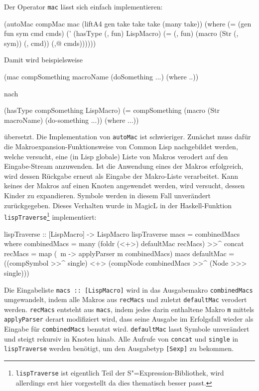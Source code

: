 \documentclass[12pt, a4paper, bibgerm]{scrbook}
\newenvironment{DIFnomarkup}{}{}
\newcommand\icode[1]{\lstinline?#1?}
\newcommand{\sexp}{S"=Expression}
\begin{document}
Der Operator \icode{mac} lässt sich einfach implementieren:
\begin{DIFnomarkup}\begin{code}
(autoMac compMac mac
  (liftA4 gen take take take (many take))
  (where (= (gen fun sym cmd cmds)
            (' (hasType (, fun) LispMacro)
               (= (, fun) (macro (Str (, sym)) (, cmd)) (,@ cmds))))))  
\end{code}\end{DIFnomarkup}
Damit wird beispielsweise 
\begin{DIFnomarkup}\begin{code}
(mac compSomething macroName 
    (doSomething ...) 
  (where ..))
\end{code}\end{DIFnomarkup}
nach
\begin{DIFnomarkup}\begin{code}
(hasType compSomething LispMacro)
(= compSomething (macro (Str macroName)
                   (do-something ...))
  (where ...))
\end{code}\end{DIFnomarkup}
übersetzt. Die Implementation von \icode{autoMac} ist
schwieriger. Zunächst muss dafür die Makroexpansion-Funktionsweise von
Common Lisp nachgebildet werden, welche versucht, eine (in Lisp globale)
Liste von Makros verodert auf den Eingabe-Stream anzuwenden. Ist die
Anwendung eines der Makros erfolgreich, wird dessen Rückgabe erneut als
Eingabe der Makro-Liste verarbeitet. Kann keines der Makros auf einen
Knoten angewendet werden, wird versucht, dessen Kinder zu
expandieren. Symbole werden in diesem Fall unverändert
zurückgegeben. Dieses Verhalten wurde in MagicL in der Haskell-Funktion
\icode{lispTraverse}\footnote{\icode{lispTraverse} ist eigentlich Teil
  der \sexp{}-Bibliothek, wird allerdings erst hier vorgestellt da dies
  thematisch besser passt.} implementiert:
\begin{DIFnomarkup}\begin{code}
lispTraverse :: [LispMacro] -> LispMacro
lispTraverse macs = combinedMacs
  where combinedMacs = many (foldr (<+>) defaultMac recMacs) >>^ concat
        recMacs      = map (\ m -> applyParser m combinedMacs) macs
        defaultMac   = ((compSymbol >>^ single) <+> 
                        (compNode combinedMacs >>^ (Node >>> single)))  
\end{code}\end{DIFnomarkup}
Die Eingabeliste \icode{macs :: [LispMacro]} wird in das Ausgabemakro
\icode{combinedMacs} umgewandelt, indem alle Makros aus \icode{recMacs}
und zuletzt \icode{defaultMac} verodert werden. \icode{recMacs} entsteht
aus \icode{macs}, indem jedes darin enthaltene Makro \icode{m} mittels
\icode{applyParser} derart modifiziert wird, dass seine Ausgabe im
Erfolgsfall wieder als Eingabe für \icode{combinedMacs} benutzt
wird. \icode{defaultMac} lasst Symbole unverändert und steigt rekursiv
in Knoten hinab. Alle Aufrufe von \icode{concat} und \icode{single} in
\icode{lispTraverse} werden benötigt, um den Ausgabetyp \icode{[Sexp]}
zu bekommen.
\end{document}
